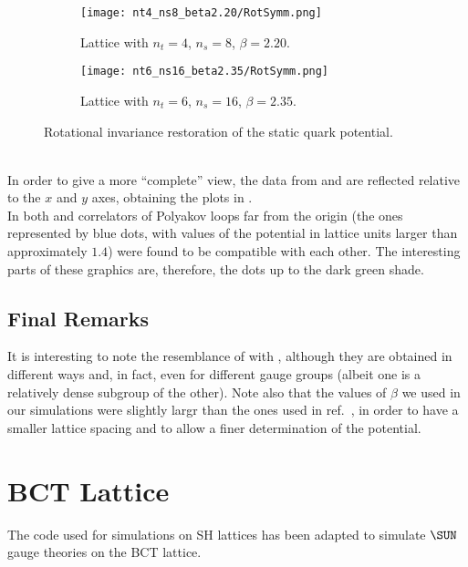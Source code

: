 \begin{figure}[!htbp]
    \centering
    \begin{subfigure}[b]{0.48\textwidth}
        \texttt{[image: nt4\_ns8\_beta2.20/RotSymm.png]}
        \caption{Lattice with $n_t=4$, $n_s=8$, $\beta=2.20$.}
        \label{4F:PotentialRestorationLargea}
    \end{subfigure}
    \begin{subfigure}[b]{0.48\textwidth}
        \texttt{[image: nt6\_ns16\_beta2.35/RotSymm.png]}
        \caption{Lattice with $n_t=6$, $n_s=16$, $\beta=2.35$.}
        \label{4F:PotentialRestorationSmalla}
    \end{subfigure}
    \caption{Rotational invariance restoration of the static quark potential.}
    \label{4F:PotentialRestoration}
\end{figure}\\
In order to give a more ``complete'' view, the data from  and  are reflected relative to the $x$ and $y$ axes, obtaining the plots in .\\
In both  and  correlators of Polyakov loops far from the origin (the ones represented by blue dots, with values of the potential in lattice units larger than approximately $1.4$) were found to be compatible with each other.
The interesting parts of these graphics are, therefore, the dots up to the dark green shade.

\subsection{Final Remarks}
It is interesting to note the resemblance of  with , although they are obtained in different ways and, in fact, even for different gauge groups (albeit one is a relatively dense subgroup of the other).
Note also that the values of $\beta$ we used in our simulations were slightly largr than the ones used in ref.~\cite{Lang:1982tj}, in order to have a smaller lattice spacing and to allow a finer determination of the potential.

\section{BCT Lattice\label{Sec4:Code}}
The code used for simulations on SH lattices has been adapted to simulate $\SUN$ gauge theories on the BCT lattice.

